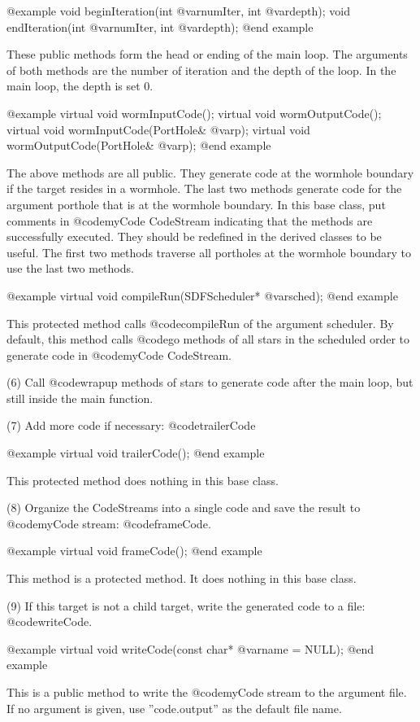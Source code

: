 @example
void beginIteration(int @var{numIter}, int @var{depth});
void endIteration(int @var{numIter}, int @var{depth});
@end example

These public methods form the head or ending of the main loop. The arguments of
both methods are the number of iteration and the depth of the loop. In the
main loop, the depth is set 0.

@example
virtual void wormInputCode();
virtual void wormOutputCode();
virtual void wormInputCode(PortHole& @var{p});
virtual void wormOutputCode(PortHole& @var{p});
@end example

The above methods are all public. They generate code at the wormhole 
boundary if
the target resides in a wormhole. The last two methods generate code
for the argument porthole that is at the wormhole boundary. In this
base class, put comments in @code{myCode} CodeStream indicating that
the methods are successfully executed. They should be redefined in the
derived classes to be useful. The first two methods traverse all
portholes at the wormhole boundary to use the last two methods.

@example
virtual void compileRun(SDFScheduler* @var{sched});
@end example

This protected method calls @code{compileRun} of the argument scheduler.
By default, this method calls @code{go} methods of all stars in the scheduled
order to generate code in @code{myCode} CodeStream.

(6) Call @code{wrapup} methods of stars to generate code after the main loop,
but still inside the main function.

(7) Add more code if necessary: @code{trailerCode}

@example
virtual void trailerCode();
@end example

This protected method does nothing in this base class.

(8) Organize the CodeStreams into a single code and save the result to
@code{myCode} stream: @code{frameCode}.

@example
virtual void frameCode();
@end example

This method is a protected method. It does nothing in this base class.

(9) If this target is not a child target, write the generated code to a file:
@code{writeCode}.

@example
virtual void writeCode(const char* @var{name} = NULL);
@end example

This is a public method to write the @code{myCode} stream to the argument
file. If no argument is given, use ''code.output'' as the default file name.

